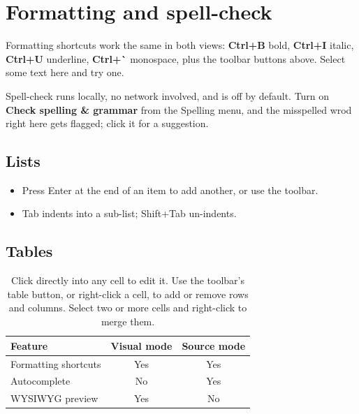 \section{Formatting and spell-check}

Formatting shortcuts work the same in both views: \textbf{Ctrl+B} bold, \textbf{Ctrl+I} italic,
\textbf{Ctrl+U} underline, \textbf{Ctrl+\`{}} monospace, plus the toolbar buttons above. Select some
text here and try one.

Spell-check runs locally, no network involved, and is off by default. Turn on \textbf{Check
spelling \& grammar} from the Spelling menu, and the misspelled wrod right here gets flagged; click
it for a suggestion.

\subsection{Lists}

\begin{itemize}
	\item Press Enter at the end of an item to add another, or use the toolbar.
	\item Tab indents into a sub-list; Shift+Tab un-indents.
\end{itemize}

\subsection{Tables}

\begin{table}[h]
	\centering
	\begin{tabular}{lcc}
		\toprule
		Feature & Visual mode & Source mode \\
		\midrule
		Formatting shortcuts & Yes & Yes \\
		Autocomplete & No & Yes \\
		WYSIWYG preview & Yes & No \\
		\bottomrule
	\end{tabular}
	\caption{Click directly into any cell to edit it. Use the toolbar's table button, or right-click a cell, to add or remove rows and columns. Select two or more cells and right-click to merge them.}
\end{table}
